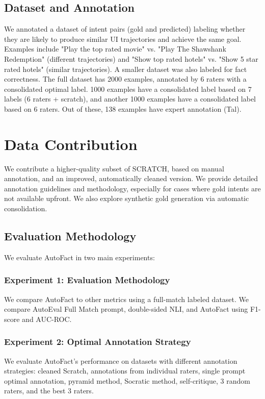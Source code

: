 
\subsection{Dataset and Annotation}

We annotated a dataset of intent pairs (gold and predicted) labeling whether they are likely to produce similar UI trajectories and achieve the same goal.  Examples include "Play the top rated movie" vs. "Play The Shawshank Redemption" (different trajectories) and "Show top rated hotels" vs. "Show 5 star rated hotels" (similar trajectories).  A smaller dataset was also labeled for fact correctness. The full dataset has 2000 examples, annotated by 6 raters with a consolidated optimal label. 1000 examples have a consolidated label based on 7 labels (6 raters + scratch), and another 1000 examples have a consolidated label based on 6 raters. Out of these, 138 examples have expert annotation (Tal).

\section{Data Contribution}

We contribute a higher-quality subset of SCRATCH, based on manual annotation, and an improved, automatically cleaned version.  We provide detailed annotation guidelines and methodology, especially for cases where gold intents are not available upfront.  We also explore synthetic gold generation via automatic consolidation.


\subsection{Evaluation Methodology}

We evaluate AutoFact in two main experiments:

\subsubsection{Experiment 1: Evaluation Methodology}

We compare AutoFact to other metrics using a full-match labeled dataset. We compare AutoEval Full Match prompt, double-sided NLI, and AutoFact using F1-score and AUC-ROC.

\subsubsection{Experiment 2: Optimal Annotation Strategy}

We evaluate AutoFact's performance on datasets with different annotation strategies: cleaned Scratch, annotations from individual raters, single prompt optimal annotation, pyramid method, Socratic method, self-critique, 3 random raters, and the best 3 raters.
